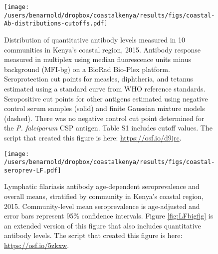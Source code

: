 \documentclass[11pt]{article}
\title{}
\author{}
\date{}
\begin{document}

\renewcommand{\figurename}{Fig.}


\begin{figure}[htbp]
\begin{center}
\texttt{[image: /users/benarnold/dropbox/coastalkenya/results/figs/coastal-Ab-distributions-cutoffs.pdf]} 
\begin{minipage}{0.9\textwidth}
\caption{Distribution of quantitative antibody levels measured in 10 communities in Kenya's coastal region, 2015. Antibody response measured in multiplex using median fluorescence units minus background (MFI-bg) on a BioRad Bio-Plex platform. Seroprotection cut points for measles, diphtheria, and tetanus estimated using a standard curve from WHO reference standards. Seropositive cut points for other antigens estimated using negative control serum samples (solid) and finite Gaussian mixture models (dashed). There was no negative control cut point determined for the \textit{P. falciparum} CSP antigen. Table S1 includes cutoff values. The script that created this figure is here: \url{https://osf.io/d9jrc}.}
\label{fig:Abdist}
\end{minipage}
\end{center}
\end{figure}


\begin{figure}[htbp]
\begin{center}
\texttt{[image: /users/benarnold/dropbox/coastalkenya/results/figs/coastal-seroprev-LF.pdf]} 
\begin{minipage}{0.9\textwidth}
\caption{Lymphatic filariasis antibody age-dependent seroprevalence and overall means, stratified by community in Kenya's coastal region, 2015. Community-level mean seroprevalence is age-adjusted and error bars represent 95\% confidence intervals. Figure \ref{fig:LFbigfig} is an extended version of this figure that also includes quantitative antibody levels. The script that created this figure is here: \url{https://osf.io/5zkxw}.}
\label{fig:LFseroprev}
\end{minipage}
\end{center}
\end{figure}
\end{document}
